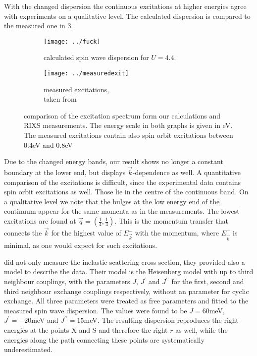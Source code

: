 With the changed dispersion the continuous excitations at higher energies agree with experiments on a qualitative level. 
The calculated dispersion is compared to the measured one in \ref{continuum}.
\begin{figure}
 \centering
 \begin{subfigure}{0.49\linewidth}
  \texttt{[image: ../fuck]}
  \caption{calculated spin wave dispersion for $U=4.4$.}
  \label{tttU44_longw}
 \end{subfigure}
\begin{subfigure}{.49\linewidth}
 \texttt{[image: ../measuredexit]}
 \caption{measured excitations, \\taken from \cite{PhysRevLett.108.177003} }
 \label{experimental_longw}
\end{subfigure}
\caption{comparison of the excitation spectrum  form our calculations and RIXS measurements. The energy scale in both graphs is given in eV. 
	  The measured excitations contain also spin orbit excitations between 0.4eV and 0.8eV}
\label{continuum}	  
\end{figure}
Due to the changed energy bands, our result shows no longer a constant boundary at the lower end, but displays $\vec k$-dependence as well.
A quantitative comparison of the excitations is difficult, since the experimental data contains  spin orbit excitations as well. Those lie in the centre 
of the continuous band.
On a qualitative level we note that the bulges at the low energy end of the continuum  appear for the same momenta as in the measurements. 
The lowest excitations are found at $\vec q = (\frac14,\frac14)$. This is the momentum transfer that connects the $\vec k$ for the highest value of $E^-_{\vec k}$ with the 
momentum, where $E^+_{\vec k}$ is minimal, as one would expect for such excitations.








\citet{PhysRevLett.108.177003} did not only measure the inelastic scattering cross section, they provided also a model to describe the data.
Their model is the Heisenberg model with up to third neighbour couplings, with the parameters $J$, $J^{\prime}$ and $J^{\prime \prime}$ for
the first, second and third neighbour exchange couplings respectively, without an parameter for cyclic exchange. 
All three parameters were treated as free parameters and fitted to the measured spin wave dispersion. 
The values were found to be $J=60$meV, $J^{\prime}=-20$meV and $J^{\prime\prime}=15$meV. 
The resulting dispersion reproduces the right energies at the points X and S and therefore the right $r$ as well,
while the energies along the path connecting these points are systematically underestimated.



